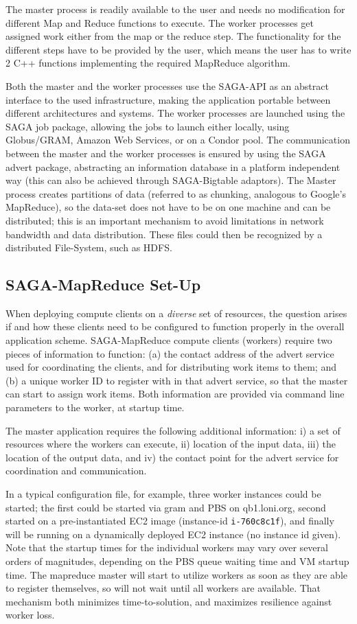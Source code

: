 \documentclass[conference,final]{IEEEtran}
\newcommand{\sagamapreduce }{SAGA-MapReduce }
\newcommand{\T}[1]{\texttt{#1}}
\newcommand{\I}[1]{\textit{#1}}
\begin{document}
The master process is readily available to the user and needs no
modification for different Map and Reduce functions to execute.  The
worker processes get assigned work either from the map or the reduce
step. The functionality for the different steps have to be provided by
the user, which means the user has to write 2 C++ functions
implementing the required MapReduce algorithm.

Both the master and the worker processes use the SAGA-API as an
abstract interface to the used infrastructure, making the application
portable between different architectures and systems. The worker
processes are launched using the SAGA job package, allowing the jobs
to launch either locally, using Globus/GRAM, Amazon Web Services, or
on a Condor pool. The communication between the master and the worker
processes is ensured by using the SAGA advert package, abstracting an
information database in a platform independent way (this can also be
achieved through SAGA-Bigtable adaptors).  The Master process creates
partitions of data (referred to as chunking, analogous to Google's
MapReduce), so the data-set does not have to be on one machine and can
be distributed; this is an important mechanism to avoid limitations in
network bandwidth and data distribution.  These files could then be
recognized by a distributed File-System, such as HDFS. 

\subsection{\sagamapreduce Set-Up}
When deploying compute clients on a \I{diverse} set of resources, the
question arises if and how these clients need to be configured to
function properly in the overall application scheme.  \sagamapreduce
compute clients (workers) require two pieces of information to
function: (a) the contact address of the advert service used for
coordinating the clients, and for distributing work items to them; and
(b) a unique worker ID to register with in that advert service, so
that the master can start to assign work items.  Both information are
provided via command line parameters to the worker, at startup time.

The master application requires the following additional information:
i) a set of resources where the workers can execute, ii) location of
the input data, iii) the location of the output data, and iv) the
contact point for the advert service for coordination and
communication.  

In a typical configuration file, for example, three worker instances
could be started; the first could be started via gram and PBS on
qb1.loni.org, second started on a pre-instantiated EC2 image
(instance-id \T{i-760c8c1f}), and finally will be running on a
dynamically deployed EC2 instance (no instance id given).  Note that
the startup times for the individual workers may vary over several
orders of magnitudes, depending on the PBS queue waiting time and VM
startup time.  The mapreduce master will start to utilize workers as
soon as they are able to register themselves, so will not wait until
all workers are available.  That mechanism both minimizes
time-to-solution, and maximizes resilience against worker loss.
\end{document}
